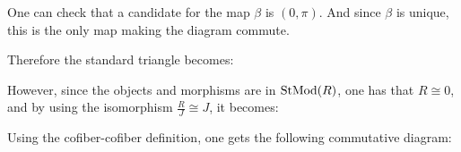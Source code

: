One can check that a candidate for the map \( \beta \) is \( (0, \pi) \). And since \( \beta \) is unique, this is the only map making the diagram commute.

Therefore the standard triangle becomes:

\begin{center}
\end{center}

However, since the objects and morphisms are in \( \operatorname{StMod}(R) \), one has that \( R \cong 0 \), and by using the isomorphism \( \frac{R}{J} \cong J \), it becomes:

\begin{center}
\end{center}

Using the cofiber-cofiber definition, one gets the following commutative diagram:

